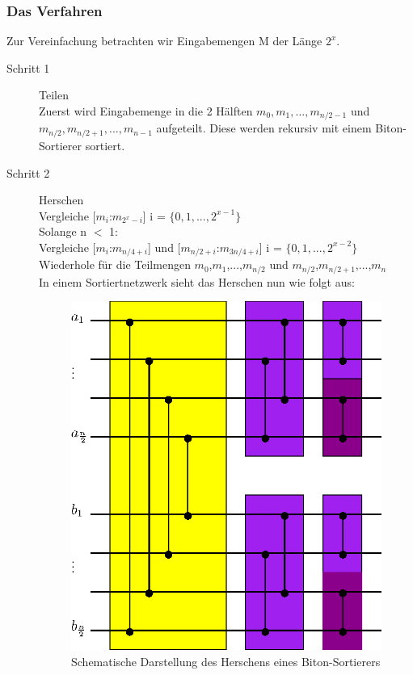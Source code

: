 \documentclass[11pt,ngerman]{article}
\begin{document}
\subsubsection{Das Verfahren}
Zur Vereinfachung betrachten wir Eingabemengen M der Länge $2^x$.\\
\begin{description}
\item[Schritt 1] Teilen\\Zuerst wird Eingabemenge in die 2 Hälften $m_0, m_1, ..., m_{n/2-1}$ und $m_{n/2}, m_{n/2+1}, ..., m_{n-1}$ aufgeteilt. Diese werden rekursiv mit einem Biton-Sortierer sortiert.
\item[Schritt 2] Herschen\\Vergleiche [$m_i$:$m_{2^x-i}$] i = $\{0, 1, ..., 2^{x-1}\}$\\Solange n $<$ 1:\\ Vergleiche [$m_i$:$m_{n/4+i}$] und [$m_{n/2+i}$:$m_{3n/4+i}$] i = $\{0, 1, ..., 2^{x-2}\}$\\Wiederhole für die Teilmengen $m_0$,$m_1$,...,$m_{n/2}$ und $m_{n/2}$,$m_{n/2+1}$,...,$m_{n}$\\
In einem Sortiertnetzwerk sieht das Herschen nun wie folgt aus:\\
\begin{figure}
\begin{center}
\includegraphics[scale=0.8]{bitonmischer.eps}
\end{center}
\caption{Schematische Darstellung des \glqq Herschens\grqq{}  eines Biton-Sortierers}
\label{fig:bitonmischer}
\end{figure}
\end{description}
\end{document}

